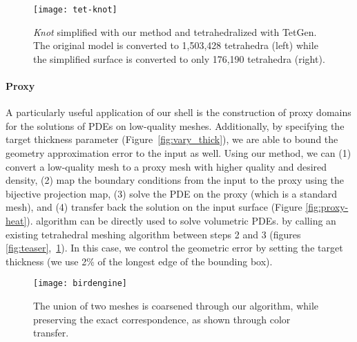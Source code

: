 \begin{figure}
    \centering
    \texttt{[image: tet-knot]}
    \caption{\emph{Knot} simplified with our method and tetrahedralized with TetGen. 
    The original model is converted to 1,503,428 tetrahedra (left) while the simplified surface is converted to only
    176,190 tetrahedra (right).}
    \label{fig:proxy-tetgen}
    
\end{figure}


\paragraph{Proxy}
A particularly useful application of our shell is the construction of proxy domains for the solutions of PDEs on low-quality meshes. 
Additionally, by specifying the target thickness parameter (Figure~\ref{fig:vary_thick}),
we are able to bound the geometry approximation error to the input as well.
Using our method,
we can (1) convert a low-quality mesh to a proxy mesh with higher quality and desired density, (2) map the boundary conditions from the input to the proxy using the bijective projection map, (3) solve the PDE on the proxy (which is a standard mesh), and (4) transfer back the solution on the input surface (Figure \ref{fig:proxy-heat}). 
 algorithm can be directly used to solve volumetric PDEs.
by calling an existing tetrahedral meshing algorithm between steps 2 and 3 (figures \ref{fig:teaser},~\ref{fig:proxy-tetgen}). 
In this case, we control the geometric error by setting the target thickness (we use 2\% of the longest edge of the bounding box).



\begin{figure}
    \centering
    \texttt{[image: birdengine]}
    \caption{The union of two meshes is coarsened through our algorithm, while preserving the exact correspondence, as shown through color transfer.}
    \label{fig:birdengine}
    
\end{figure}

